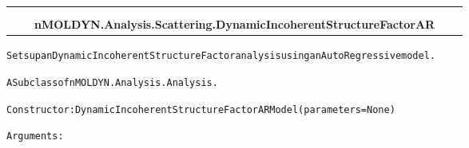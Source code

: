     \label{nMOLDYN:Analysis:Scattering:DynamicIncoherentStructureFactorAR}
\begin{tabular}{cccccc}
\multicolumn{2}{r}{\settowidth{\BCL}{nMOLDYN.Analysis.Analysis.Analysis}\multirow{2}{\BCL}{nMOLDYN.Analysis.Analysis.Analysis}}
&&
  \\\cline{3-3}
  &&\multicolumn{1}{c|}{}
&&
  \\
&&\multicolumn{2}{l}{\textbf{nMOLDYN.Analysis.Scattering.DynamicIncoherentStructureFactorAR}}
\end{tabular}

\begin{alltt}
Sets up an Dynamic Incoherent Structure Factor analysis using an Auto Regressive model.

A Subclass of nMOLDYN.Analysis.Analysis. 

Constructor: DynamicIncoherentStructureFactorARModel({\textbar}parameters{\textbar} = None)

Arguments:


\end{alltt}
